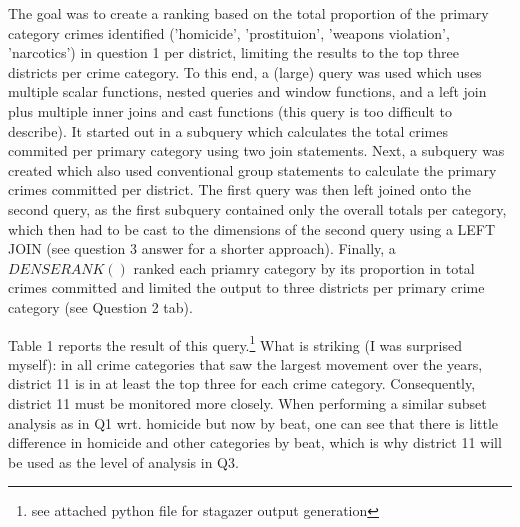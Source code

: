 \documentclass[a4paper]{article}
\begin{document}
The goal was to create a ranking based on the total proportion of the primary category crimes identified ('homicide', 'prostituion', 'weapons violation', 'narcotics') in question 1 per district, limiting the results to the top three districts per crime category. To this end, a (large) query was used which uses multiple scalar functions, nested queries and window functions, and a left join plus multiple inner joins and cast functions (this query is too difficult to describe). It started out in a subquery which calculates the total crimes commited per primary category using two join statements. Next, a subquery was created which also used conventional group statements to calculate the primary crimes committed per district. The first query was then left joined onto the second query, as the first subquery contained only the overall totals per category, which then had to be cast to the dimensions of the second query using a LEFT JOIN (see question 3 answer for a shorter approach). Finally, a $DENSE RANK()$ ranked each priamry category by its proportion in total crimes committed and limited the output to three districts per primary crime category (see Question 2 tab).

Table 1 reports the result of this query.\footnote{see attached python file for stagazer output generation} What is striking (I was surprised myself): in all crime categories that saw the largest movement over the years, district 11 is in at least the top three for each crime category. Consequently, district 11 must be monitored more closely. When performing a similar subset analysis as in Q1 wrt. homicide but now by beat, one can see that there is little difference in homicide and other categories by beat, which is why district 11 will be used as the level of analysis in Q3. 
\end{document}
